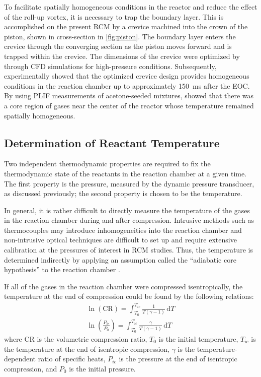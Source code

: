 \documentclass[../main.tex]{subfiles}
\begin{document}
To facilitate spatially homogeneous conditions in the reactor
and reduce the effect of the roll-up vortex, it is necessary to trap
the boundary layer. This is accomplished on the present RCM by a
crevice machined into the crown of the piston, shown in cross-section
in \autoref{fig:piston}. The boundary layer enters the crevice through
the converging section as the piston moves forward and is trapped
within the crevice. The dimensions of the crevice were optimized
by \textcite{Mittal2006a} through CFD simulations for high-pressure
conditions. Subsequently, \textcite{Mittal2006b} experimentally showed that
the optimized crevice design provides homogeneous conditions in the
reaction chamber up to approximately \SI{150}{\milli\second} after the EOC.
By using PLIF measurements of acetone-seeded mixtures,
\textcite{Mittal2006b} showed that there was a core region of gases
near the center of the reactor whose temperature remained spatially
homogeneous.

\subsection{Determination of Reactant Temperature}

Two independent thermodynamic properties are required to fix the
thermodynamic state of the reactants in the reaction chamber at a
given time. The first property is the pressure, measured by the dynamic
pressure transducer, as discussed previously; the second property
is chosen to be the temperature.

In general, it is rather difficult to directly measure the temperature
of the gases in the reaction chamber during and after compression.
Intrusive methods such as thermocouples may introduce inhomogeneities into
the reaction chamber and non-intrusive optical techniques are difficult to set up
and require extensive calibration at the pressures of interest in RCM
studies. Thus, the temperature is determined indirectly by applying an
assumption called the ``adiabatic core hypothesis'' to the reaction chamber
\cite{Mittal2007, Lee1998}.

If all of the gases in the reaction chamber were compressed isentropically,
the temperature at the end of compression could be found by the
following relations:
%
\begin{subequations}
\label{eq:tic}
\begin{align}
\ln\left(\text{CR}\right) = \int_{T_0}^{T_{ic}} \! \frac{1}{T\left(\gamma-1\right)} \, \mathrm{d} T \\
\ln\left(\frac{P_{ic}}{P_0}\right) = \int_{T_0}^{T_{ic}} \! \frac{\gamma}{T\left(\gamma-1\right)} \, \mathrm{d} T
\end{align}
\end{subequations}
%
where CR is the volumetric compression ratio, $T_0$ is the initial temperature,
$T_{ic}$ is the temperature at the end of isentropic compression, $\gamma$ is the
temperature-dependent ratio of specific heats, $P_{ic}$ is the pressure at the
end of isentropic compression, and $P_0$ is the initial pressure.
\end{document}
